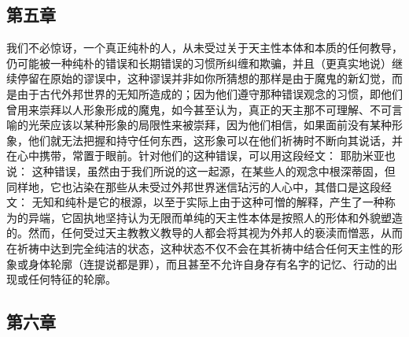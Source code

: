 
\subsection{第五章}

\par

我们不必惊讶，一个真正纯朴的人，从未受过关于天主性本体和本质的任何教导，仍可能被一种纯朴的错误和长期错误的习惯所纠缠和欺骗，并且（更真实地说）继续停留在原始的谬误中，这种谬误并非如你所猜想的那样是由于魔鬼的新幻觉，而是由于古代外邦世界的无知所造成的；因为他们遵守那种错误观念的习惯，即他们曾用来崇拜以人形象形成的魔鬼，如今甚至认为，真正的天主那不可理解、不可言喻的光荣应该以某种形象的局限性来被崇拜，因为他们相信，如果面前没有某种形象，他们就无法把握和持守任何东西，这形象可以在他们祈祷时不断向其说话，并在心中携带，常置于眼前。针对他们的这种错误，可以用这段经文：  耶肋米亚也说：  这种错误，虽然由于我们所说的这一起源，在某些人的观念中根深蒂固，但同样地，它也沾染在那些从未受过外邦世界迷信玷污的人心中，其借口是这段经文：  无知和纯朴是它的根源，以至于实际上由于这种可憎的解释，产生了一种称为的异端，它固执地坚持认为无限而单纯的天主性本体是按照人的形体和外貌塑造的。然而，任何受过天主教教义教导的人都会将其视为外邦人的亵渎而憎恶，从而在祈祷中达到完全纯洁的状态，这种状态不仅不会在其祈祷中结合任何天主性的形象或身体轮廓（连提说都是罪），而且甚至不允许自身存有名字的记忆、行动的出现或任何特征的轮廓。\par


\subsection{第六章}

\par

